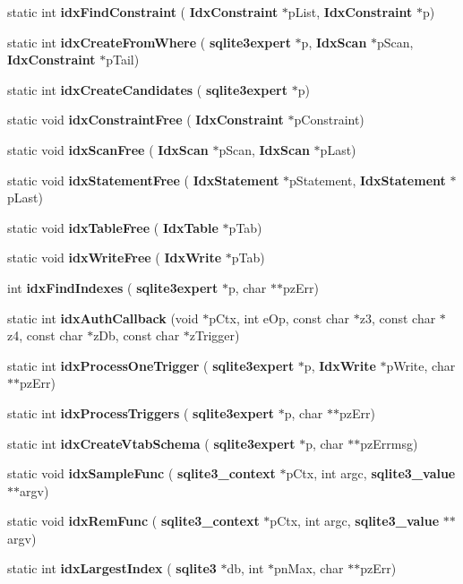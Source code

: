 \begin{DoxyCompactItemize}
\item 
static int \textbf{ idx\+Find\+Constraint} (\textbf{ Idx\+Constraint} $\ast$p\+List, \textbf{ Idx\+Constraint} $\ast$p)
\item 
static int \textbf{ idx\+Create\+From\+Where} (\textbf{ sqlite3expert} $\ast$p, \textbf{ Idx\+Scan} $\ast$p\+Scan, \textbf{ Idx\+Constraint} $\ast$p\+Tail)
\item 
static int \textbf{ idx\+Create\+Candidates} (\textbf{ sqlite3expert} $\ast$p)
\item 
static void \textbf{ idx\+Constraint\+Free} (\textbf{ Idx\+Constraint} $\ast$p\+Constraint)
\item 
static void \textbf{ idx\+Scan\+Free} (\textbf{ Idx\+Scan} $\ast$p\+Scan, \textbf{ Idx\+Scan} $\ast$p\+Last)
\item 
static void \textbf{ idx\+Statement\+Free} (\textbf{ Idx\+Statement} $\ast$p\+Statement, \textbf{ Idx\+Statement} $\ast$p\+Last)
\item 
static void \textbf{ idx\+Table\+Free} (\textbf{ Idx\+Table} $\ast$p\+Tab)
\item 
static void \textbf{ idx\+Write\+Free} (\textbf{ Idx\+Write} $\ast$p\+Tab)
\item 
int \textbf{ idx\+Find\+Indexes} (\textbf{ sqlite3expert} $\ast$p, char $\ast$$\ast$pz\+Err)
\item 
static int \textbf{ idx\+Auth\+Callback} (void $\ast$p\+Ctx, int e\+Op, const char $\ast$z3, const char $\ast$z4, const char $\ast$z\+Db, const char $\ast$z\+Trigger)
\item 
static int \textbf{ idx\+Process\+One\+Trigger} (\textbf{ sqlite3expert} $\ast$p, \textbf{ Idx\+Write} $\ast$p\+Write, char $\ast$$\ast$pz\+Err)
\item 
static int \textbf{ idx\+Process\+Triggers} (\textbf{ sqlite3expert} $\ast$p, char $\ast$$\ast$pz\+Err)
\item 
static int \textbf{ idx\+Create\+Vtab\+Schema} (\textbf{ sqlite3expert} $\ast$p, char $\ast$$\ast$pz\+Errmsg)
\item 
static void \textbf{ idx\+Sample\+Func} (\textbf{ sqlite3\+\_\+context} $\ast$p\+Ctx, int argc, \textbf{ sqlite3\+\_\+value} $\ast$$\ast$argv)
\item 
static void \textbf{ idx\+Rem\+Func} (\textbf{ sqlite3\+\_\+context} $\ast$p\+Ctx, int argc, \textbf{ sqlite3\+\_\+value} $\ast$$\ast$argv)
\item 
static int \textbf{ idx\+Largest\+Index} (\textbf{ sqlite3} $\ast$db, int $\ast$pn\+Max, char $\ast$$\ast$pz\+Err)
$$
\end{DoxyCompactItemize}
